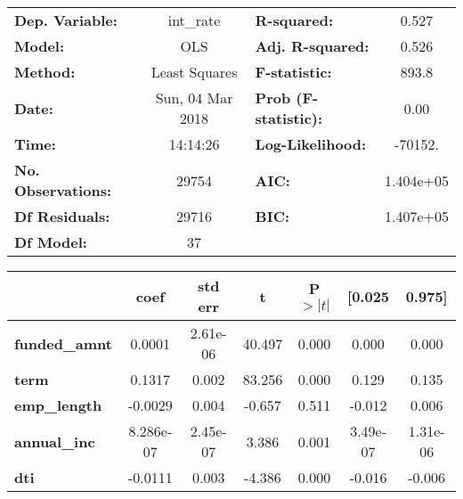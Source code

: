 \begin{center}
\begin{tabular}{lclc}
\toprule
\textbf{Dep. Variable:}                        &     int\_rate     & \textbf{  R-squared:         } &     0.527   \\
\textbf{Model:}                                &       OLS        & \textbf{  Adj. R-squared:    } &     0.526   \\
\textbf{Method:}                               &  Least Squares   & \textbf{  F-statistic:       } &     893.8   \\
\textbf{Date:}                                 & Sun, 04 Mar 2018 & \textbf{  Prob (F-statistic):} &     0.00    \\
\textbf{Time:}                                 &     14:14:26     & \textbf{  Log-Likelihood:    } &   -70152.   \\
\textbf{No. Observations:}                     &       29754      & \textbf{  AIC:               } & 1.404e+05   \\
\textbf{Df Residuals:}                         &       29716      & \textbf{  BIC:               } & 1.407e+05   \\
\textbf{Df Model:}                             &          37      & \textbf{                     } &             \\
\bottomrule
\end{tabular}
\begin{tabular}{lcccccc}
                                               & \textbf{coef} & \textbf{std err} & \textbf{t} & \textbf{P$>|t|$} & \textbf{[0.025} & \textbf{0.975]}  \\
\midrule
\textbf{funded\_amnt}                          &       0.0001  &     2.61e-06     &    40.497  &         0.000        &        0.000    &        0.000     \\
\textbf{term}                                  &       0.1317  &        0.002     &    83.256  &         0.000        &        0.129    &        0.135     \\
\textbf{emp\_length}                           &      -0.0029  &        0.004     &    -0.657  &         0.511        &       -0.012    &        0.006     \\
\textbf{annual\_inc}                           &    8.286e-07  &     2.45e-07     &     3.386  &         0.001        &     3.49e-07    &     1.31e-06     \\
\textbf{dti}                                   &      -0.0111  &        0.003     &    -4.386  &         0.000        &       -0.016    &       -0.006     \\

\end{tabular}
\end{center}
